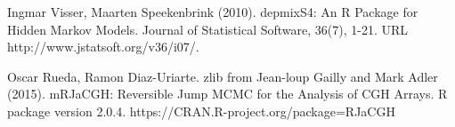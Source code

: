 \begin{thebibliography}{00}
 Ingmar Visser, Maarten Speekenbrink (2010). 
\newblock depmixS4: An R Package for Hidden Markov Models. 
\newblock Journal of Statistical Software, 36(7), 1-21. URL http://www.jstatsoft.org/v36/i07/.

 Oscar Rueda, Ramon Diaz-Uriarte. zlib from Jean-loup Gailly and Mark Adler (2015). 
\newblock mRJaCGH: Reversible Jump MCMC for the Analysis of CGH Arrays. 
\newblock R package version 2.0.4. https://CRAN.R-project.org/package=RJaCGH

\end{thebibliography}


